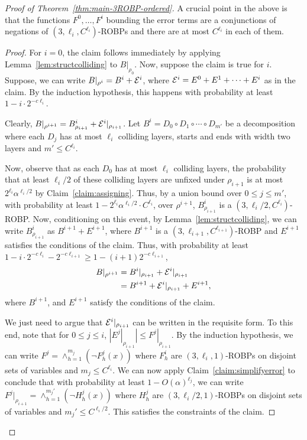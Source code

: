 \begin{proof}[Proof of Theorem~\ref{thm:main-3ROBP-ordered}]
A crucial point in the above is that the functions $F^0,\ldots,F^i$ bounding the error terms are a conjunctions of negations of $(3,\ell_i,C^{\ell_i})$-ROBPs and there are at most $C^{\ell_i}$ in each of them. 
\begin{proof}
For $i= 0$, the claim follows immediately by applying Lemma~\ref{lem:structcolliding} to $B|_{\rho_0}$. Now, suppose the claim is true for $i$. Suppose, we can write $B|_{\rho^i} = B^i + {\cal E}^i$, where ${\cal E}^i = E^0 + E^1 + \cdots + E^i$ as in the claim. By the induction hypothesis, this happens with probability at least $1 - i \cdot 2^{-c \ell_i}$. 

Clearly, $B|_{\rho^{i+1}} = B^i_{\rho_{i+1}} + {\cal{E}}^i|_{\rho_{i+1}}$. Let $B^i = D_0 \circ D_1 \circ \cdots \circ D_{m'}$ be a decomposition where each $D_j$ has at most $\ell_i$ colliding layers, starts and ends with width two layers and $m' \leq C^{\ell_i}$.  

Now, observe that as each $D_0$ has at most $\ell_i$ colliding layers, the probability that at least $\ell_i/2$ of these colliding layers are unfixed under $\rho_{i+1}$ is at most $ 2^{\ell_i} \alpha^{\ell_i/2}$ by Claim~\ref{claim:assigning}. Thus, by a union bound over $0 \leq j \leq m'$, with probability at least $1 - 2^{\ell_i} \alpha^{\ell_i/2} \cdot C^{\ell_i}$, over $\rho^{i+1}$, $B^i_{\rho_{i+1}}$ is a $(3,\ell_i/2,C^{\ell_i})$-ROBP.  Now, conditioning on this event, by Lemma~\ref{lem:structcolliding}, we can write $B^i_{\rho_{i+1}}$ as $B^{i+1} + E^{i+1}$, where $B^{i+1}$ is a $(3,\ell_{i+1}, C^{\ell_{i+1}})$-ROBP and $E^{i+1}$ satisfies the conditions of the claim. Thus, with probability at least $1 - i \cdot 2^{-c \ell_i} - 2^{-c \ell_{i+1}} \geq 1 - (i+1) 2^{-c \ell_{i+1}}$, 
\begin{align*}
B|_{\rho^{i+1}} &= B^i|_{\rho_{i+1}} + {\cal E}^i|_{\rho_{i+1}} \\
&= B^{i+1} + {\cal E}^i|_{\rho_{i+1}} + E^{i+1},
\end{align*}
where $B^{i+1}$, and $E^{i+1}$ satisfy the conditions of the claim. 

We just need to argue that ${\cal E}^i|_{\rho_{i+1}}$ can be written in the requisite form. To this end, note that for $0 \leq j \leq i$, $|E^j|_{\rho_{i+1}}| \leq F^j|_{\rho_{i+1}}$. By the induction hypothesis, we can write $F^j = \wedge_{h=1}^{m_j} (\neg F_h^j(x))$ where $F_h^i$ are $(3,\ell_i,1)$-ROBPs on disjoint sets of variables and $m_j \leq C^{\ell_i}$. We can now apply Claim~\ref{claim:simplifyerror} to conclude that with probability at least $1 - O(\alpha)^{\ell_j}$, we can write $F^j|_{\rho_{i+1}} = \wedge_{h=1}^{m_j'} (\neg H_h^j(x))$ where $H_h^j$ are $(3,\ell_i/2,1)$-ROBPs on disjoint sets of variables and $m_j' \leq C^{\ell_i/2}$. This satisfies the constraints of the claim. 


\end{proof}
\end{proof}

